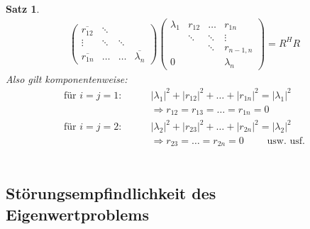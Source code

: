 \documentclass[%
a4paper,
11pt,		%
]
{scrartcl}
\theoremstyle{plain}
\theoremstyle{plain}
\newtheorem{mysatz}[mydef]{Satz}
\theoremstyle{plain}
\theoremstyle{plain}
\begin{document}
\begin{mysatz}
\begin{align*}
\begin{pmatrix}
\overline{r_{12}}       & \ddots\\
\vdots                  & \ddots & \ddots\\
\overline{r_{1n}}       & \dots & \dots & \overline{\lambda_n}
\end{pmatrix}
\begin{pmatrix}
\lambda_1   & r_{12}    & \dots     & r_{1n}\\
            & \ddots    & \ddots    & \vdots\\
            &           & \ddots    & r_{n-1,n}\\
0           &           &           & \lambda_n
\end{pmatrix}
= R^H R
\end{align*}
Also gilt komponentenweise:
\begin{align*}
\text{für } i=j=1: \qquad & |\lambda_1|^2 + |r_{12}|^2 + \dots + |r_{1n}|^2 = |\lambda_1|^2\\
& \Rightarrow r_{12} = r_{13} = \dots = r_{1n} = 0\\
\text{für } i=j=2: \qquad & |\lambda_2|^2 + |r_{23}|^2 + \dots + |r_{2n}|^2 = |\lambda_2|^2\\
& \Rightarrow r_{23} = \dots = r_{2n} = 0 \qquad \text{ usw. usf.}
\end{align*}
\
\end{mysatz}

\subsection{Störungsempfindlichkeit des Eigenwertproblems}
\label{sub:Störungsempfindlichkeit des Eigenwertproblems}
\end{document}
